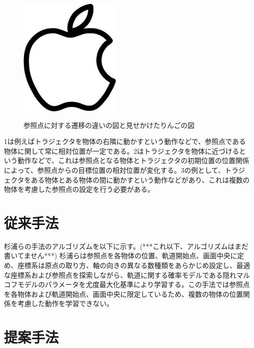 	\begin{figure}[t]
		\begin{center}
			\includegraphics[width=5cm]{apple.png} \\ %
			\caption{参照点に対する遷移の違いの図と見せかけたりんごの図}
			\label{figure:difference_displacement}
		\end{center}
	\end{figure}


1は例えばトラジェクタを物体の右隣に動かすという動作などで、参照点である物体に関して常に相対位置が一定である。2はトラジェクタを物体に近づけるという動作などで、これは参照点となる物体とトラジェクタの初期位置の位置関係によって、参照点からの目標位置の相対位置が変化する。3の例として、トラジェクタをある物体とある物体の間に動かすという動作などがあり、これは複数の物体を考慮した参照点の設定を行う必要がある。

\section{従来手法}

杉浦ら\cite{sugiura}の手法のアルゴリズムを以下に示す。(***これ以下、アルゴリズムはまだ書いてません***)
杉浦らは参照点を各物体の位置、軌道開始点、画面中央に定め、座標系は原点の取り方、軸の向きの異なる数種類をあらかじめ設定し、最適な座標系および参照点を探索しながら、軌道に関する確率モデルである隠れマルコフモデルのパラメータを尤度最大化基準により学習する。この手法では参照点を各物体および軌道開始点、画面中央に限定しているため、複数の物体の位置関係を考慮した動作を学習できない。

\section{提案手法}

